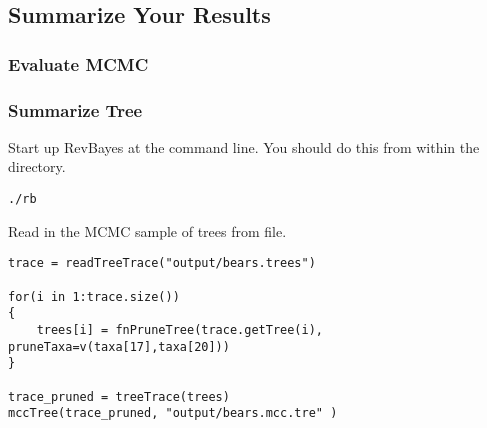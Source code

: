 \bigskip
\subsection{Summarize Your Results}

\medskip
\subsubsection{Evaluate MCMC}



\medskip
\subsubsection{Summarize Tree}


Start up RevBayes at the command line. You should do this from within the  directory.
{\tt \begin{snugshade*}
\begin{lstlisting}
./rb
\end{lstlisting}
\end{snugshade*}}

Read in the MCMC sample of trees from file.
{\tt \begin{snugshade*}
\begin{lstlisting}
trace = readTreeTrace("output/bears.trees")

for(i in 1:trace.size())
{
    trees[i] = fnPruneTree(trace.getTree(i), pruneTaxa=v(taxa[17],taxa[20]))
}

trace_pruned = treeTrace(trees)
mccTree(trace_pruned, "output/bears.mcc.tre" )
\end{lstlisting}
\end{snugshade*}}

